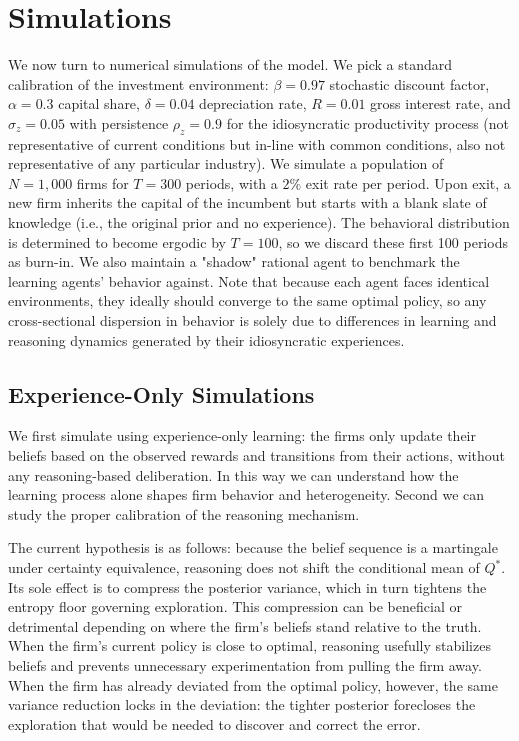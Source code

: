 \section{Simulations}

We now turn to numerical simulations of the model. We pick a standard calibration of 
the investment environment: $\beta = 0.97$ stochastic discount factor, $\alpha = 0.3$ 
capital share, $\delta = 0.04$ depreciation rate, $R = 0.01$ gross interest rate, 
and $\sigma_z = 0.05$ with persistence $\rho_z = 0.9$ for the idiosyncratic 
productivity process (not representative of current conditions but in-line with common
conditions, also not representative of any particular industry). We simulate a population
of $N = 1{,}000$ firms for $T = 300$ periods, with a $2\%$ exit rate per period. Upon
exit, a new firm inherits the capital of the incumbent but starts with a blank slate
of knowledge (i.e., the original prior and no experience). The behavioral distribution is determined to become ergodic by $T = 100$, so we discard 
these first 100 periods as burn-in. We also maintain a "shadow" rational agent to 
benchmark the learning agents' behavior against. Note that because each agent faces
identical environments, they ideally should converge to the same optimal policy, so 
any cross-sectional dispersion in behavior is solely due to differences in learning and 
reasoning dynamics generated by their idiosyncratic experiences.

\subsection{Experience-Only Simulations}

We first simulate using experience-only learning: the firms only update their beliefs 
based on the observed rewards and transitions from their actions, without any reasoning-based deliberation.
In this way we can understand how the learning process alone shapes firm behavior and 
heterogeneity. Second we can study the proper calibration of the reasoning mechanism.

The current hypothesis is as follows: because the belief sequence is a martingale under certainty equivalence, reasoning 
does not shift the conditional mean of $Q^*$. Its sole effect is to compress the 
posterior variance, which in turn tightens the entropy floor governing exploration. 
This compression can be beneficial or detrimental depending on where the firm's 
beliefs stand relative to the truth. When the firm's current policy is close to 
optimal, reasoning usefully stabilizes beliefs and prevents unnecessary 
experimentation from pulling the firm away. When the firm has already deviated 
from the optimal policy, however, the same variance reduction locks in the 
deviation: the tighter posterior forecloses the exploration that would be needed 
to discover and correct the error.


